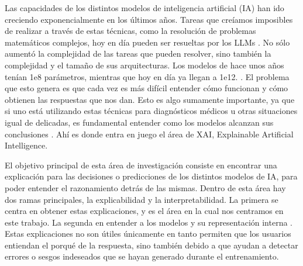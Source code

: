 Las capacidades de los distintos modelos de inteligencia artificial (IA) han ido creciendo exponencialmente en los últimos años. Tareas que creíamos imposibles de realizar a través de estas técnicas, como la resolución de problemas matemáticos complejos, hoy en día pueden ser resueltas por los LLMs \cite{frontierMath}. No sólo aumentó la complejidad de las tareas que pueden resolver, sino también la complejidad y el tamaño de sus arquitecturas. Los modelos de hace unos años tenían 1e8 parámetros, mientras que hoy en día ya llegan a 1e12. \cite{EpochLargeScaleModels2024}. El problema que esto genera es que cada vez es más difícil entender cómo funcionan y cómo obtienen las respuestas que nos dan. Esto es algo sumamente importante, ya que si uno está utilizando estas técnicas para diagnósticos médicos u otras situaciones igual de delicadas, es fundamental  entender como los modelos alcanzan sus conclusiones . Ahí es donde entra en juego el área de XAI, Explainable Artificial Intelligence.

El objetivo principal de esta área de investigación consiste en encontrar una explicación para las decisiones o predicciones de los distintos modelos de IA, para poder entender el razonamiento detrás de las mismas. Dentro de esta área hay dos ramas principales, la explicabilidad y la interpretabilidad. La primera se centra en obtener estas explicaciones, y es el área en la cual nos centramos en este trabajo. La segunda en entender a los modelos y su representación interna \cite{interpretabilityPaper}. Estas explicaciones no son útiles únicamente en tanto permiten que los usuarios entiendan el porqué de la respuesta, sino también debido a que ayudan a detectar errores o sesgos indeseados que se hayan generado durante el entrenamiento. 

